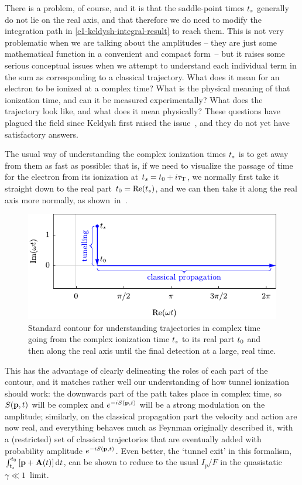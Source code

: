 There is a problem, of course, and it is that the saddle-point times $\ts$ generally do not lie on the real axis, and that therefore we do need to modify the integration path in \eqref{e1-keldysh-integral-result} to reach them. This is not very problematic when we are talking about the amplitudes -- they are just some mathematical function in a convenient and compact form~-- but it raises some serious conceptual issues when we attempt to understand each individual term in the sum as corresponding to a classical trajectory. What does it mean for an electron to be ionized at a complex time? What is the physical meaning of that ionization time, and can it be measured experimentally? What does the trajectory look like, and what does it mean physically? These questions have plagued the field since Keldysh first raised the issue~\cite{keldysh_ionization_1965}, and they do not yet have satisfactory answers.


The usual way of understanding the complex ionization times $\ts$ is to get away from them as fast as possible: that is, if we need to visualize the passage of time for the electron from its ionization at ${t_s} = {t_0} +i{\tau_\mathrm{T}}$, we normally first take it straight down to the real part ${t_0}=\Re({t_s})$, and we can then take it along the real axis more normally, as shown~in~.

\begin{figure}[ht]
  \centering
  \includegraphics[scale=1]{1-Introduction/Figures/figure1B.pdf}
  \caption[Standard contour from the complex ionization time $\ts$ to its real part $\tn$ and then along the real axis]{
  Standard contour for understanding trajectories in complex time going from the complex ionization time $\ts$ to its real part $\tn$ and then along the real axis until the final detection at a large, real time.
  }
\label{f1-initial-contour}
\end{figure}

This has the advantage of clearly delineating the roles of each part of the contour, and it matches rather well our understanding of how tunnel ionization should work: the downwards part of the path takes place in complex time, so $S(\vb{p},t)$ will be complex and $e^{-iS(\vb{p},t)}$ will be a strong modulation on the amplitude; similarly, on the classical propagation part the velocity and action are now real, and everything behaves much as Feynman originally described it, with a (restricted) set of classical trajectories that are eventually added with probability amplitude $e^{-iS(\vb{p},t)}$. Even better, the `tunnel exit' in this formalism, $\int_{{t_s}}^{{t_0}}\left[\vb{p}+\vb{A}(t)\right]\mathrm{d} t$, can be shown to reduce to the usual $I_p/F$ in the quasistatic $\gamma \ll 1$~limit.


